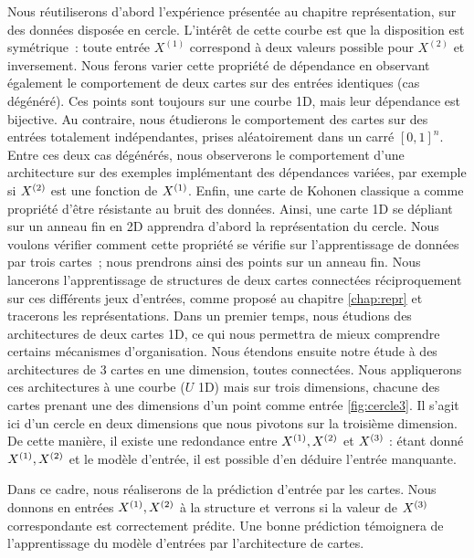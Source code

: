 \documentclass[../main]{subfiles}
\begin{document}
Nous réutiliserons d'abord l'expérience présentée au chapitre représentation, sur des données disposée en cercle. L'intérêt de cette courbe est que la disposition est symétrique~: toute entrée $X^{(1)}$ correspond à deux valeurs possible pour $X^{(2)}$ et inversement.
Nous ferons varier cette propriété de dépendance en observant également le comportement de deux cartes sur des entrées identiques (cas dégénéré). Ces points sont toujours sur une courbe 1D, mais leur dépendance est bijective.
Au contraire, nous étudierons le comportement des cartes sur des entrées totalement indépendantes, prises aléatoirement dans un carré $[0,1]^n$.
Entre ces deux cas dégénérés, nous observerons le comportement d'une architecture sur des exemples implémentant des dépendances variées, par exemple si $X^{({2})}$ est une fonction de $X^{({1})}$.
Enfin, une carte de Kohonen classique a comme propriété d'être résistante au bruit des données. Ainsi, une carte 1D se dépliant sur un anneau fin en 2D apprendra d'abord la représentation du cercle. Nous voulons vérifier comment cette propriété se vérifie sur l'apprentissage de données par trois cartes~; nous prendrons ainsi des points sur un anneau fin.
Nous lancerons l'apprentissage de structures de deux cartes connectées réciproquement sur ces différents jeux d'entrées, comme proposé au chapitre \ref{chap:repr} et tracerons les représentations. 
Dans un premier temps, nous étudions des architectures de deux cartes 1D, ce qui nous permettra de mieux comprendre certains mécanismes d'organisation.
Nous étendons ensuite notre étude à des architectures de 3 cartes en une dimension, toutes connectées. Nous appliquerons ces architectures à une courbe ($U$ 1D) mais sur trois dimensions, chacune des cartes prenant une des dimensions d'un point comme entrée \ref{fig:cercle3}. Il s'agit ici d'un cercle en deux dimensions que nous pivotons sur la troisième dimension. De cette manière, il existe une redondance entre $X^{({1})}, X^{({2})}$ et $X^{({3})}$ : étant donné $X^{({1})}, X^{({2})}$ et le modèle d'entrée, il est possible d'en déduire l'entrée manquante.

Dans ce cadre, nous réaliserons de la prédiction d'entrée par les cartes. Nous donnons en entrées $X^{({1})}, X^{({2})}$ à la structure et verrons si la valeur de $X^{({3})}$ correspondante est correctement prédite. Une bonne prédiction témoignera de l'apprentissage du modèle d'entrées par l'architecture de cartes.
\end{document}
